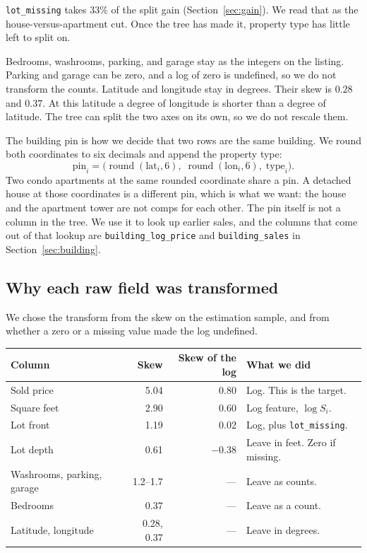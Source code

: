 \documentclass[11pt]{article}
\begin{document}
\texttt{lot\_missing} takes \(33\%\) of the split gain (Section~\ref{sec:gain}). We read that as the house-versus-apartment cut. Once the tree has made it, property type has little left to split on.

Bedrooms, washrooms, parking, and garage stay as the integers on the listing. Parking and garage can be zero, and a log of zero is undefined, so we do not transform the counts. Latitude and longitude stay in degrees. Their skew is \(0.28\) and \(0.37\). At this latitude a degree of longitude is shorter than a degree of latitude. The tree can split the two axes on its own, so we do not rescale them.

The building pin is how we decide that two rows are the same building. We round both coordinates to six decimals and append the property type:
\[
\text{pin}_i = \bigl(\operatorname{round}(\text{lat}_i, 6),\; \operatorname{round}(\text{lon}_i, 6),\; \text{type}_i\bigr).
\]
Two condo apartments at the same rounded coordinate share a pin. A detached house at those coordinates is a different pin, which is what we want: the house and the apartment tower are not comps for each other. The pin itself is not a column in the tree. We use it to look up earlier sales, and the columns that come out of that lookup are \texttt{building\_log\_price} and \texttt{building\_sales} in Section~\ref{sec:building}.

\subsection{Why each raw field was transformed}

We chose the transform from the skew on the estimation sample, and from whether a zero or a missing value made the log undefined.

\begin{center}
\small
\begin{tabular}{lrrl}
\toprule
Column & Skew & Skew of the log & What we did \\
\midrule
Sold price & 5.04 & 0.80 & Log. This is the target. \\
Square feet & 2.90 & 0.60 & Log feature, \(\log S_i\). \\
Lot front & 1.19 & 0.02 & Log, plus \texttt{lot\_missing}. \\
Lot depth & 0.61 & \(-0.38\) & Leave in feet. Zero if missing. \\
Washrooms, parking, garage & 1.2--1.7 & --- & Leave as counts. \\
Bedrooms & 0.37 & --- & Leave as a count. \\
Latitude, longitude & 0.28, 0.37 & --- & Leave in degrees. \\
\bottomrule
\end{tabular}
\end{center}
\end{document}

